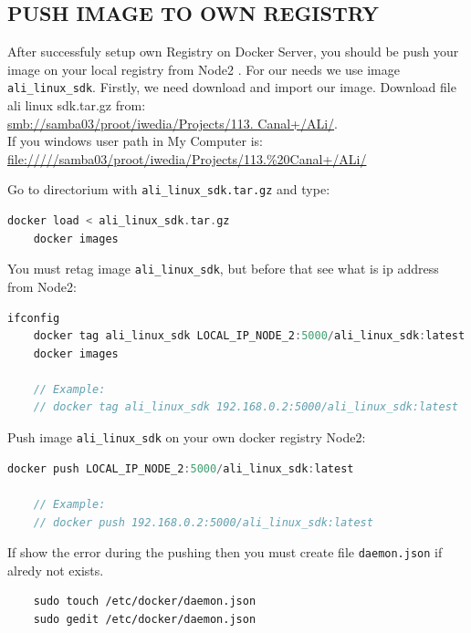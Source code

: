 \documentclass[12pt]{report}
\newcommand{\code}[1]{\texttt{#1}} %
\newcommand{\myred}[1]{{\color{my_red}#1}}
\begin{document}
\subsection{PUSH IMAGE TO OWN REGISTRY}
After successfuly setup own Registry on Docker Server, you should be push your image on your local registry from \myred{Node2} . For our needs we use image \code{ali{\_}linux{\_}sdk}. Firstly, we need download and import our image.
\newline
\newline
Download file ali linux sdk.tar.gz from:\\ \url{smb://samba03/proot/iwedia/Projects/113. Canal+/ALi/}. \\
If you windows user path in My Computer is: \\ \url{file://///samba03/proot/iwedia/Projects/113.%20Canal+/ALi/}
\newline
\newline

Go to directorium  with \code{ali{\_}linux{\_}sdk.tar.gz} and type:
\begin{lstlisting}[language=C, caption= Import image \code{ali{\_}linux{\_}sdk} .]
	docker load < ali_linux_sdk.tar.gz
	docker images
\end{lstlisting}

You must retag image \code{ali{\_}linux{\_}sdk}, but before that see what is ip address from \myred{Node2}:
\begin{lstlisting}[language=C, caption= Retag image.]
	ifconfig 
	docker tag ali_linux_sdk LOCAL_IP_NODE_2:5000/ali_linux_sdk:latest
	docker images
	
	// Example:
	// docker tag ali_linux_sdk 192.168.0.2:5000/ali_linux_sdk:latest
\end{lstlisting}

Push image \code{ali{\_}linux{\_}sdk} on your own docker registry \myred{Node2}:
\begin{lstlisting}[language=C, caption= Push image on your own registry.]
	docker push LOCAL_IP_NODE_2:5000/ali_linux_sdk:latest

	// Example:
	// docker push 192.168.0.2:5000/ali_linux_sdk:latest
\end{lstlisting}

If show the error during the pushing then you must create file \code{daemon.json} if alredy not exists.
\begin{lstlisting}
	sudo touch /etc/docker/daemon.json
	sudo gedit /etc/docker/daemon.json
\end{lstlisting}
\end{document}

